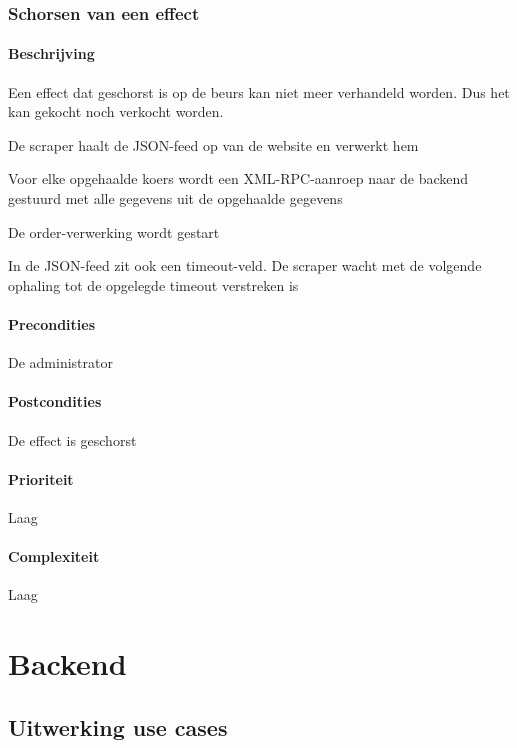 \subsubsection{Schorsen van een effect}
\begin{compact}
\paragraph{Beschrijving} Een effect dat geschorst is op de beurs kan niet meer verhandeld worden. Dus het kan gekocht noch verkocht worden.
\begin{itemize_compact}
	\item De scraper haalt de JSON-feed op van de website en verwerkt hem
  \item Voor elke opgehaalde koers wordt een XML-RPC-aanroep naar de backend gestuurd met alle gegevens uit de opgehaalde gegevens
  \item De order-verwerking wordt gestart
  \item In de JSON-feed zit ook een timeout-veld. De scraper wacht met de volgende ophaling tot de opgelegde timeout verstreken is
\end{itemize_compact}
\paragraph{Precondities} De administrator 
\paragraph{Postcondities} De effect is geschorst
\paragraph{Prioriteit}Laag
\paragraph{Complexiteit}Laag
\end{compact}


\section{Backend}

\subsection{Uitwerking use cases}

